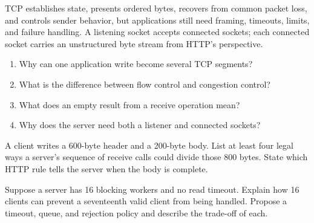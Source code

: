 \summarytitle

TCP establishes state, presents ordered bytes, recovers from common packet loss,
and controls sender behavior, but applications still need framing, timeouts,
limits, and failure handling. A listening socket accepts connected sockets; each
connected socket carries an unstructured byte stream from HTTP's perspective.

\reviewtitle
\begin{enumerate}
  \item Why can one application write become several TCP segments?
  \item What is the difference between flow control and congestion control?
  \item What does an empty result from a receive operation mean?
  \item Why does the server need both a listener and connected sockets?
\end{enumerate}

\begin{exercise}
A client writes a 600-byte header and a 200-byte body. List at least four legal
ways a server's sequence of receive calls could divide those 800 bytes. State
which HTTP rule tells the server when the body is complete.
\end{exercise}

\begin{exercise}
Suppose a server has 16 blocking workers and no read timeout. Explain how 16
clients can prevent a seventeenth valid client from being handled. Propose a
timeout, queue, and rejection policy and describe the trade-off of each.
\end{exercise}

